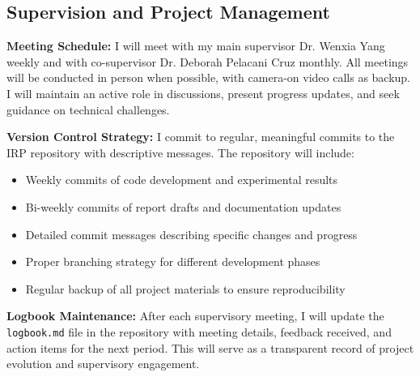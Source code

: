 \documentclass[project-plan]{report-template}
\begin{document}
\subsection{Supervision and Project Management}
\textbf{Meeting Schedule:} I will meet with my main supervisor Dr. Wenxia Yang weekly and with co-supervisor Dr. Deborah Pelacani Cruz monthly. All meetings will be conducted in person when possible, with camera-on video calls as backup. I will maintain an active role in discussions, present progress updates, and seek guidance on technical challenges.

\textbf{Version Control Strategy:} I commit to regular, meaningful commits to the IRP repository with descriptive messages. The repository will include:
\begin{itemize}
    \item Weekly commits of code development and experimental results
    \item Bi-weekly commits of report drafts and documentation updates  
    \item Detailed commit messages describing specific changes and progress
    \item Proper branching strategy for different development phases
    \item Regular backup of all project materials to ensure reproducibility
\end{itemize}

\textbf{Logbook Maintenance:} After each supervisory meeting, I will update the \texttt{logbook.md} file in the repository with meeting details, feedback received, and action items for the next period. This will serve as a transparent record of project evolution and supervisory engagement.


\end{document}
